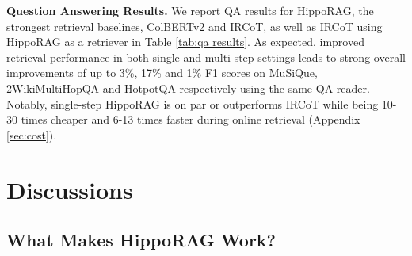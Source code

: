 \documentclass{article}
\begin{document}
\noindent \textbf{Question Answering Results.} We report QA results for HippoRAG, the strongest retrieval baselines, ColBERTv2 and IRCoT, as well as IRCoT using HippoRAG as a retriever in Table \ref{tab:qa results}. As expected, improved retrieval performance in both single and multi-step settings leads to strong overall improvements of up to \num{3}\%, \num{17}\% and \num{1}\% F1 scores on MuSiQue, 2WikiMultiHopQA and HotpotQA respectively using the same QA reader. 
Notably, single-step HippoRAG is on par or outperforms IRCoT while being \num{10}-\num{30} times cheaper and \num{6}-\num{13} times faster during online retrieval (Appendix \ref{sec:cost}).

\section{Discussions}

\subsection{What Makes HippoRAG Work?}
\end{document}
